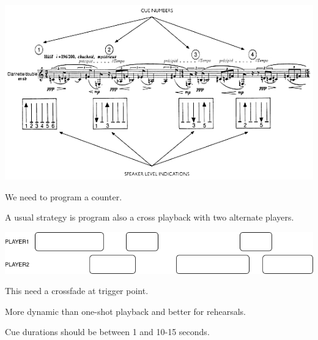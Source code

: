 \begin{center}
\includegraphics[scale=0.9]{../img/dialogue.png}
\end{center}

We need to program a counter.

A usual strategy is program also a cross playback with two alternate players.

\begin{center}
\includegraphics[scale=0.9]{../img/cross.png}
\end{center}

This need a crossfade at trigger point.

More dynamic than one-shot playback and better for rehearsals.

Cue durations should be between 1 and 10-15 seconds.

